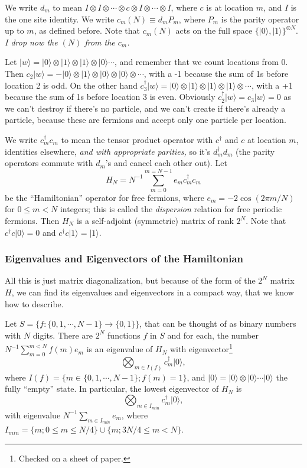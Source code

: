 	We write $d_m$ to mean $I\otimes I\otimes\cdots \otimes c \otimes I \otimes \cdots\otimes I$, where $c$ is at location $m$,
	and $I$ is the one site identity. We write $c_m (N) \equiv d_m P_m$, where $P_m$ is the parity operator up to $m$, as defined before.
	Note that $c_m (N)$ acts on the full space $\{|0\rangle, |1\rangle\}^{\otimes N}$. \emph{I drop now the $(N)$ from the $c_m$.}
	
	\begin{example}
Let $|w\rangle=|0\rangle\otimes|1\rangle\otimes|1\rangle\otimes|0\rangle\cdots$, and remember that we count locations from $0$.
	Then $c_2|w\rangle=-|0\rangle\otimes|1\rangle\otimes|0\rangle\otimes|0\rangle\otimes\cdots$, with a -1 because the sum of 1s before location 2 is odd.
	On the other hand $c^\dagger_3|w\rangle = |0\rangle\otimes|1\rangle\otimes|1\rangle\otimes|1\rangle\otimes\cdots$, with a +1 because
	the sum of 1s before location 3 is even. Obviously  $c_2^\dagger|w\rangle = c_3|w\rangle = 0$ as we can't destroy if there's no particle,
	and we can't create if there's already a particle, because these are fermions and accept only one particle per location.
	\end{example}
	 
	We write $c^\dagger_m c_m$ to mean the tensor product operator with $c^\dagger$ and $c$ at location $m$, 
	identities elsewhere, \emph{and with appropriate parities,} so it's $d^\dagger_m  d_m$ (the parity operators commute with $d_m$'s and cancel each other out).
	Let 
	\begin{equation}
	H_N=N^{-1}\sum_{m=0}^{m=N-1} e_m c^\dagger_m c_m
	\end{equation} be the ``Hamiltonian'' operator for free fermions, where $e_m = -2\cos(2\pi m/N)$ for $0\le m < N$ integers;
	this is called the \emph{dispersion} relation for free periodic fermions.
	Then $H_N$ is a self-adjoint (symmetric) matrix of rank $2^N$. Note that $c^\dagger c |0\rangle = 0$ and $c^\dagger c |1 \rangle = |1 \rangle$.
	
	\subsubsection{Eigenvalues and Eigenvectors of the Hamiltonian}
	All this is just matrix diagonalization, but because of the form of the $2^N$ matrix $H$, we can find its
	eigenvalues and eigenvectors in a compact way, that we know how to describe.
	
	Let $S = \{ f: \{0, 1, \cdots, N - 1\} \rightarrow \{0, 1\}\}$, that can be thought of as binary numbers with $N$ digits.
	There are $2^N$ functions $f$ in $S$ and for each, the number
	$N^{-1}\sum_{m=0}^{m < N} f(m) e_m$ is an eigenvalue of $H_N$ with eigenvector\footnote{Checked on a sheet of paper.}
	\[
	\bigotimes_{m\in I(f)}c^\dagger_{m}|0\rangle,
	\]
	 where $I(f) = \{m\in\{0, 1, \cdots, N - 1\}; f(m) = 1\}$,  
	and $|0\rangle = |0\rangle\otimes|0\rangle\cdots|0\rangle$ the fully ``empty'' state.
 	 In particular, the lowest eigenvector of $H_N$ is
 	 \[
 	 \bigotimes_{m\in I_{min}}c^\dagger_{m}|0\rangle,
 	 \]
 	 with eigenvalue $N^{-1}\sum_{m \in I_{min}} e_m$, where $I_{min} = \{m; 0\le m \le N/4\}\cup\{m; 3N/4\le m < N\}$.
 	
